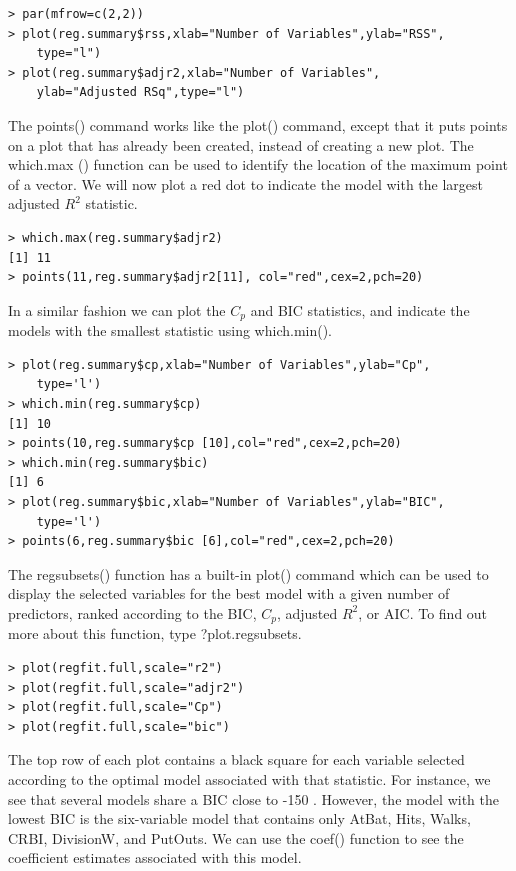 \documentclass[10pt]{article}
\begin{document}
\begin{verbatim}
> par(mfrow=c(2,2))
> plot(reg.summary$rss,xlab="Number of Variables",ylab="RSS",
    type="l")
> plot(reg.summary$adjr2,xlab="Number of Variables",
    ylab="Adjusted RSq",type="l")
\end{verbatim}

The points() command works like the plot() command, except that it puts points on a plot that has already been created, instead of creating a new plot. The which.max () function can be used to identify the location of the maximum point of a vector. We will now plot a red dot to indicate the model with the largest adjusted $R^{2}$ statistic.

\begin{verbatim}
> which.max(reg.summary$adjr2)
[1] 11
> points(11,reg.summary$adjr2[11], col="red",cex=2,pch=20)
\end{verbatim}

In a similar fashion we can plot the $C_{p}$ and BIC statistics, and indicate the models with the smallest statistic using which.min().

\begin{verbatim}
> plot(reg.summary$cp,xlab="Number of Variables",ylab="Cp",
    type='l')
> which.min(reg.summary$cp)
[1] 10
> points(10,reg.summary$cp [10],col="red",cex=2,pch=20)
> which.min(reg.summary$bic)
[1] 6
> plot(reg.summary$bic,xlab="Number of Variables",ylab="BIC",
    type='l')
> points(6,reg.summary$bic [6],col="red",cex=2,pch=20)
\end{verbatim}

The regsubsets() function has a built-in plot() command which can be used to display the selected variables for the best model with a given number of predictors, ranked according to the BIC, $C_{p}$, adjusted $R^{2}$, or AIC. To find out more about this function, type ?plot.regsubsets.

\begin{verbatim}
> plot(regfit.full,scale="r2")
> plot(regfit.full,scale="adjr2")
> plot(regfit.full,scale="Cp")
> plot(regfit.full,scale="bic")
\end{verbatim}

The top row of each plot contains a black square for each variable selected according to the optimal model associated with that statistic. For instance, we see that several models share a BIC close to -150 . However, the model with the lowest BIC is the six-variable model that contains only AtBat, Hits, Walks, CRBI, DivisionW, and PutOuts. We can use the coef() function to see the coefficient estimates associated with this model.
\end{document}
